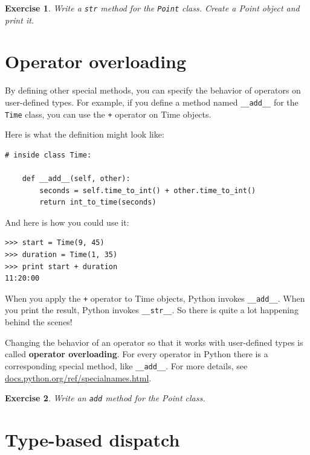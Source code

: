 \documentclass[12pt,a4paper,final,twoside,onecolumn,titlepage]{book}
\newtheorem{exercise}{Exercise}[chapter]
\begin{document}
\begin{exercise}

Write a {\tt str} method for the {\tt Point} class.  Create
a Point object and print it.

\end{exercise}


\section{Operator overloading}
\label{operator.overloading}

By defining other special methods, you can specify the behavior
of operators on user-defined types.  For example, if you define
a method named \verb"__add__" for the {\tt Time} class, you can use the
{\tt +} operator on Time objects.

Here is what the definition might look like:

\begin{verbatim}
# inside class Time:

    def __add__(self, other):
        seconds = self.time_to_int() + other.time_to_int()
        return int_to_time(seconds)
\end{verbatim}
%
And here is how you could use it:

\begin{verbatim}
>>> start = Time(9, 45)
>>> duration = Time(1, 35)
>>> print start + duration
11:20:00
\end{verbatim}
%
When you apply the {\tt +} operator to Time objects, Python invokes
\verb"__add__".  When you print the result, Python invokes 
\verb"__str__".  So there is quite a lot happening behind the scenes!

Changing the behavior of an operator so that it works with
user-defined types is called {\bf operator overloading}.  For every
operator in Python there is a corresponding special method, like 
\verb"__add__".  For more details, see
\url{docs.python.org/ref/specialnames.html}.

\begin{exercise}

Write an {\tt add} method for the Point class.  

\end{exercise}


\section{Type-based dispatch}
\end{document}
